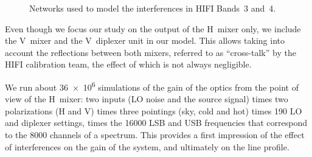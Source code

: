 \begin{figure}[b]
    \centering
    
    \caption{Networks used to model the interferences in HIFI Bands~3 and~4.}
    \label{fig:band45_networks}
\end{figure}

Even though we focus our study on the output of the H~mixer only, we include the V~mixer and the V~diplexer unit in our model.
This allows taking into account the reflections between both mixers, referred to as ``cross-talk'' by the HIFI calibration team, the effect of which is not always negligible.

We run about \num{36e6} simulations of the gain of the optics from the point of view of the H~mixer: two inputs (LO noise and the source signal) times two polarizations (H and V) times three pointings (sky, cold and hot) times 190 LO and diplexer settings, times the \num{16000} LSB and USB frequencies that correspond to the 8000 channels of a spectrum.
This provides a first impression of the effect of interferences on the gain of the system, and ultimately on the line profile.

